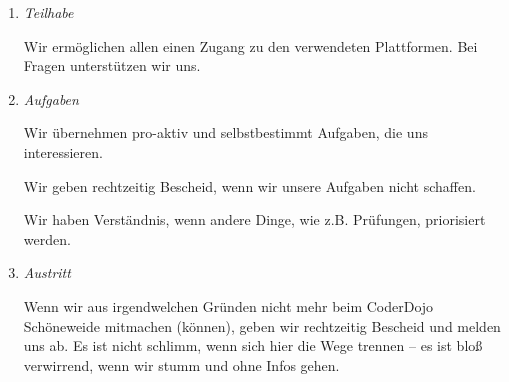 \begin{enumerate}
    \item \textit{Teilhabe}

    Wir ermöglichen allen einen Zugang zu den verwendeten Plattformen.
    Bei Fragen unterstützen wir uns.

    \item \textit{Aufgaben}

    Wir übernehmen pro-aktiv und selbstbestimmt Aufgaben, die uns interessieren.

    Wir geben rechtzeitig Bescheid, wenn wir unsere Aufgaben nicht schaffen.

    Wir haben Verständnis, wenn andere Dinge, wie z.B. Prüfungen, priorisiert werden.

    \item \textit{Austritt}

    Wenn wir aus irgendwelchen Gründen nicht mehr beim CoderDojo Schöneweide mitmachen (können), geben wir rechtzeitig Bescheid und melden uns ab.
    Es ist nicht schlimm, wenn sich hier die Wege trennen – es ist bloß verwirrend, wenn wir stumm und ohne Infos gehen.
\end{enumerate}
